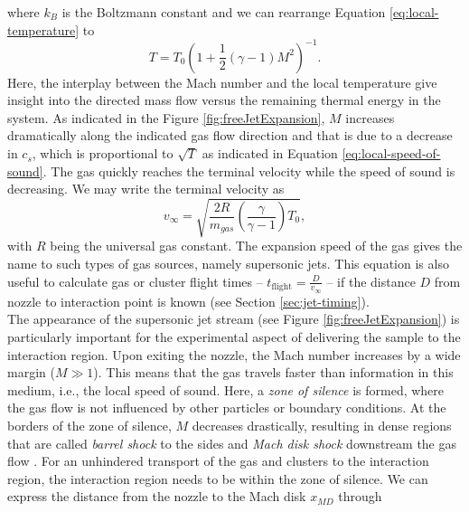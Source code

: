 where $k_{B}$ is the Boltzmann constant and we can rearrange Equation \eqref{eq:local-temperature} to 
\begin{equation}
T=T_{0}\left(1+\frac{1}{2}\left(\gamma - 1\right)M^{2}\right)^{-1}.
\label{eq:local-temperature-definition}
\end{equation}
Here, the interplay between the Mach number and the local temperature give insight into the directed mass flow versus the remaining thermal energy in the system. As indicated in the Figure \ref{fig:freeJetExpansion}, $M$ increases dramatically along the indicated gas flow direction and that is due to a decrease in $c_{s}$, which is proportional to $\sqrt{T}$ as indicated in Equation \eqref{eq:local-speed-of-sound}. The gas quickly reaches the terminal velocity while the speed of sound is decreasing. We may write the terminal velocity as
\begin{equation}
v_{\infty}=\sqrt{\frac{2 R}{m_{gas}}\left(\frac{\gamma}{\gamma-1}\right) T_{0}},
\label{eq:terminal-velocity}
\end{equation}
with $R$ being the universal gas constant. The expansion speed of the gas gives the name to such types of gas sources, namely supersonic jets. This equation is also useful to calculate gas or cluster flight times -- $t_{\text{flight}}=\frac{D}{v_{\infty}}$ -- if the distance $D$ from nozzle to interaction point is known (see Section \ref{sec:jet-timing}). \\[1\baselineskip]
%
The appearance of the supersonic jet stream (see Figure \ref{fig:freeJetExpansion}) is particularly important for the experimental aspect of delivering the sample to the interaction region. Upon exiting the nozzle, the Mach number increases by a wide margin ($M\gg 1$). This means that the gas travels faster than information in this medium, i.e., the local speed of sound. Here, a \textit{zone of silence} is formed, where the gas flow is not influenced by other particles or boundary conditions.
At the borders of the zone of silence, $M$ decreases drastically, resulting in dense regions that are called \textit{barrel shock} to the sides and \textit{Mach disk shock} downstream the gas flow \citep{Miller-1988-Oxford}. For an unhindered transport of the gas and clusters to the interaction region, the interaction region needs to be within the zone of silence. We can express the distance from the nozzle to the Mach disk $x_{MD}$ through

